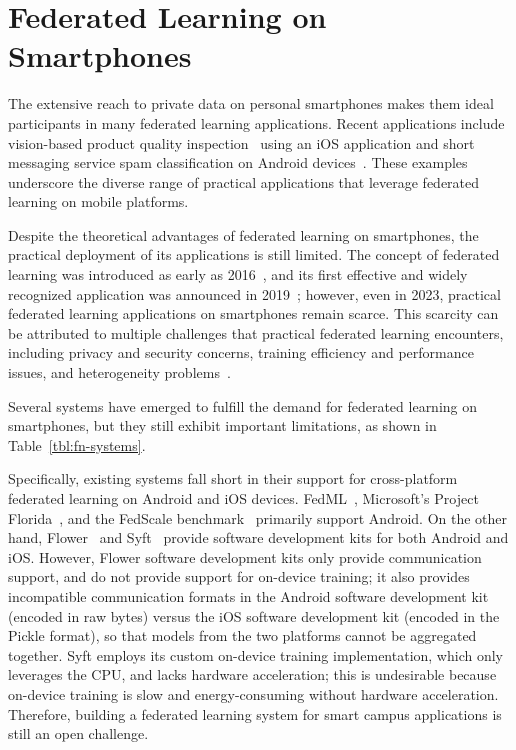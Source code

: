 \section{Federated Learning on Smartphones}

The extensive reach to private data on personal smartphones makes them ideal
participants in many federated learning applications.
Recent applications include vision-based product quality
inspection~\cite{bharti2022edge}
using an iOS application and short messaging service spam classification on Android
devices~\cite{sriraman2022device}.
These examples underscore the diverse range of practical applications that
leverage federated learning on mobile platforms.

Despite the theoretical advantages of federated learning on smartphones,
the practical deployment of its applications is still limited.
The concept of federated learning was introduced as early as
2016~\cite{mcmahan2017communication},
and its first effective and widely recognized application was announced in
2019~\cite{bonawitz2019towards}; however, even in 2023,
practical federated learning applications on smartphones remain scarce.
This scarcity can be attributed to multiple challenges that practical federated
learning encounters, including privacy and security concerns,
training efficiency and performance issues,
and heterogeneity problems~\cite{wen2023survey}.

Several systems have emerged to fulfill the demand for federated learning
on smartphones, but they still exhibit important limitations,
as shown in Table~\ref{tbl:fn-systems}.

Specifically, existing systems fall short in their support for
cross-platform federated learning on Android and iOS devices.
FedML~\cite{he2020fedml},
Microsoft's Project Florida~\cite{madrigal2023project},
and the FedScale benchmark~\cite{lai2022fedscale} primarily support Android.
On the other hand,
Flower~\cite{beutel2020flower,mathur2021ondevice} and
Syft~\cite{ryffel2018generic,Ziller2021,hall2021syft}
provide software development kits for both Android and iOS.
However, Flower software development kits only provide communication support,
and do not provide support for on-device training;
it also provides incompatible communication formats in
the Android software development kit (encoded in raw bytes)
versus the iOS software development kit (encoded in the Pickle format),
so that models from the two platforms cannot be aggregated together.
Syft employs its custom on-device training implementation,
which only leverages the CPU, and lacks hardware acceleration;
this is undesirable because on-device training is slow and energy-consuming
without hardware acceleration.
Therefore, building a federated learning system for smart campus applications is
still an open challenge.

